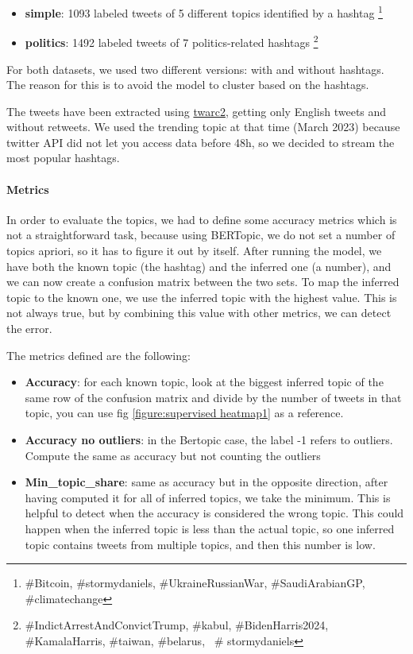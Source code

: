\begin{itemize}
    \item \textbf{simple}: 1093 labeled tweets of 5 different topics identified by a hashtag \footnote{\#Bitcoin, \#stormydaniels, \#UkraineRussianWar, \#SaudiArabianGP, \#climatechange}
    \item \textbf{politics}: 1492 labeled tweets of 7 politics-related hashtags \footnote{\#IndictArrestAndConvictTrump, \#kabul, \#BidenHarris2024, \#KamalaHarris, \#taiwan, \#belarus,  \# stormydaniels}
\end{itemize}


For both datasets, we used two different versions: with and without hashtags. The reason for this is to avoid the model to cluster based on the hashtags.

The tweets have been extracted using \href{https://twarc-project.readthedocs.io/en/latest/twarc2_en_us/}{twarc2}, getting only English tweets and without retweets. We used the trending topic at that time (March 2023)  because twitter API did not let you access data before 48h, so we decided to stream the most popular hashtags.

\paragraph{Metrics}
In order to evaluate the topics, we had to define some  accuracy metrics which is not a straightforward task, because using BERTopic, we do not set a number of topics apriori, so it has to figure it out by itself. 
After running the model, we have both the known topic (the hashtag) and the inferred one (a number), and we can now create a confusion matrix between the two sets. 
To map the inferred topic to the known one, we use the inferred topic with the highest value. This is not always true, but by combining this value with other metrics, we can detect the error.

The metrics defined are the following:

\begin{itemize}
    \item \textbf{Accuracy}:  for each known topic, look at the biggest inferred topic of the same row of the confusion matrix and divide by the number of tweets in that topic, you can use fig \ref{figure:supervised heatmap1} as a reference.
    \item \textbf{Accuracy no outliers}: in the Bertopic case, the label -1 refers to outliers. Compute the same as accuracy but not counting the outliers
    \item \textbf{Min\_topic\_share}: same as accuracy but in the opposite direction, after having computed it for all of inferred topics, we take the minimum. This is helpful to detect when the accuracy is considered the wrong topic. This could happen when the inferred topic is less than the actual topic, so one inferred topic contains tweets from multiple topics, and then this number is low.
\end{itemize}


